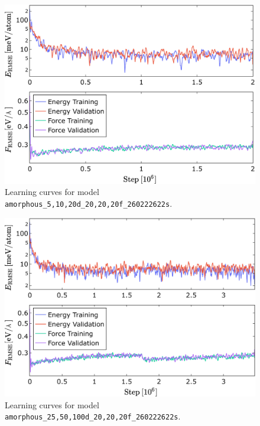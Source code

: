 \begin{figure}
  \begin{center}
    \includegraphics[width=.8\textwidth]{
      asset/amorphous_5,10,20d_20,20,20f_260222622s_energy_force_l_curve.jpg
    }
  \end{center}
  \caption{Learning curves for model \texttt{amorphous\_5,10,20d\_20,20,\allowbreak{}20f\_260222622s}.}
  \label{fig:amorphous_5,10,20d_20,20,20f_260222622s-learning-curves}
\end{figure}

\begin{figure}
  \begin{center}
    \includegraphics[width=.8\textwidth]{
      asset/amorphous_25,50,100d_20,20,20f_260222622s_energy_force_l_curve.jpg
    }
  \end{center}
  \caption{Learning curves for model \texttt{amorphous\_25,50,100d\_20,20,\allowbreak{}20f\_260222622s}.}
  \label{fig:amorphous_25,50,100d_20,20,20f_260222622s-learning-curves}
\end{figure}


